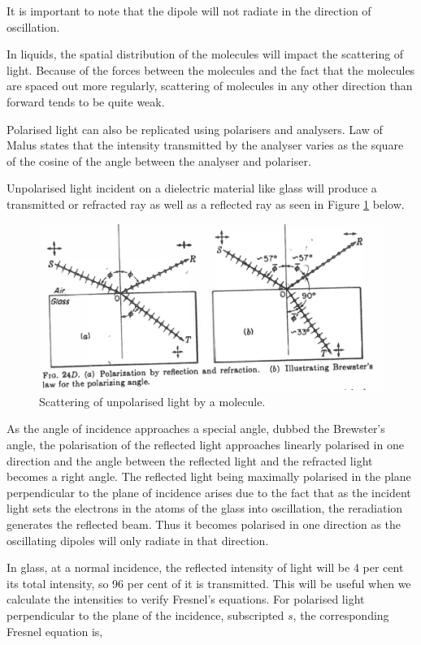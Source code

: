 \documentclass{article}
\begin{document}
It is important to note that the dipole will not radiate in the 
direction of oscillation.

In liquids, the spatial distribution of the molecules will 
impact the scattering of light. Because of the forces between 
the molecules and the fact that the molecules are spaced out 
more regularly, scattering of molecules in any other direction 
than forward tends to be quite weak.

Polarised light can also be replicated using polarisers 
and analysers. Law of Malus states that the intensity 
transmitted by the analyser varies as the square of the 
cosine of the angle between the analyser and polariser.

Unpolarised light incident on a dielectric material like glass 
will produce a transmitted or refracted ray as well as a 
reflected ray as seen in Figure \ref{fig:brewsters} below.

\begin{figure}[H]
    \centering
    \includegraphics[scale=0.2]{brewsters.png}
    \caption{Scattering of unpolarised light by a molecule.}
    \label{fig:brewsters}
\end{figure}

As the angle of incidence approaches a special angle, dubbed 
the Brewster's angle, the polarisation of the reflected light 
approaches linearly polarised in one direction and the angle 
between the reflected light and the refracted light becomes 
a right angle. The reflected light being maximally polarised
in the plane perpendicular to the plane of incidence 
arises due to the fact that as the incident light sets the 
electrons in the atoms of the glass into oscillation, the 
reradiation generates the reflected beam. Thus it becomes 
polarised in one direction as the oscillating dipoles will 
only radiate in that direction.

In glass, at a normal incidence, the reflected intensity of 
light will be 4 per cent its total intensity, so 96 per cent 
of it is transmitted. This will be useful when we calculate 
the intensities to verify Fresnel's equations. For polarised 
light perpendicular to the plane of the incidence, subscripted
$s$, the corresponding Fresnel equation is,
\end{document}
